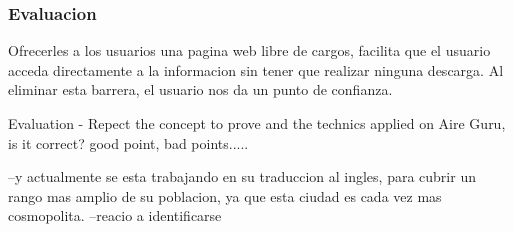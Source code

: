 \subsubsection{Evaluacion}
Ofrecerles a los usuarios una pagina web libre de cargos, facilita que el usuario acceda directamente a la informacion
sin tener que realizar ninguna descarga. Al eliminar esta barrera, el usuario nos da un punto de confianza.


Evaluation - Repect the concept to prove and the technics applied on Aire Guru, is it correct? good point, bad points.....

--y actualmente se esta trabajando en su traduccion 
al ingles, para cubrir un rango mas amplio de su poblacion, ya que esta ciudad es cada vez mas cosmopolita.
--reacio a identificarse